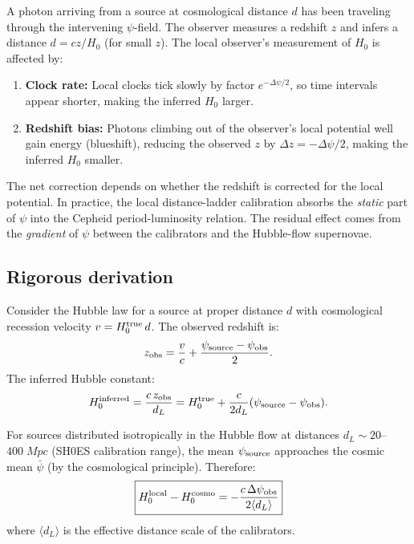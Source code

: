 \documentclass[aps,prd,twocolumn,superscriptaddress,nofootinbib,longbibliography]{revtex4-2}
\begin{document}
A photon arriving from a source at cosmological distance $d$ has been
traveling through the intervening $\psi$-field. The observer measures a
redshift $z$ and infers a distance $d = cz/H_0$ (for small $z$). The
local observer's measurement of $H_0$ is affected by:

\begin{enumerate}
\item \textbf{Clock rate:} Local clocks tick slowly by factor $e^{-\Delta\psi/2}$,
so time intervals appear shorter, making the inferred $H_0$ larger.
\item \textbf{Redshift bias:} Photons climbing out of the observer's
local potential well gain energy (blueshift), reducing the observed $z$
by $\Delta z = -\Delta\psi/2$, making the inferred $H_0$ smaller.
\end{enumerate}

The net correction depends on whether the redshift is corrected for the
local potential. In practice, the local distance-ladder calibration
absorbs the \emph{static} part of $\psi$ into the Cepheid
period-luminosity relation. The residual effect comes from the
\emph{gradient} of $\psi$ between the calibrators and the Hubble-flow
supernovae.

\subsection{Rigorous derivation}\label{sec:H0-rigorous}

Consider the Hubble law for a source at proper distance $d$ with
cosmological recession velocity $v = H_0^{\rm true}\,d$. The observed
redshift is:
\begin{equation}
z_{\rm obs} = \frac{v}{c} + \frac{\psi_{\rm source} - \psi_{\rm obs}}{2}.
\end{equation}
The inferred Hubble constant:
\begin{equation}
H_0^{\rm inferred} = \frac{c\,z_{\rm obs}}{d_L}
= H_0^{\rm true} + \frac{c}{2d_L}(\psi_{\rm source} - \psi_{\rm obs}).
\end{equation}

For sources distributed isotropically in the Hubble flow at distances
$d_L \sim 20$--$400\;\si{Mpc}$ (SH0ES calibration range), the mean
$\psi_{\rm source}$ approaches the cosmic mean $\bar{\psi}$ (by the
cosmological principle). Therefore:
\begin{equation}\label{eq:H0-DFD}
\boxed{
H_0^{\rm local} - H_0^{\rm cosmo} = -\frac{c\,\Delta\psi_{\rm obs}}{2\langle d_L\rangle}
}
\end{equation}
where $\langle d_L\rangle$ is the effective distance scale of the
calibrators.
\end{document}
